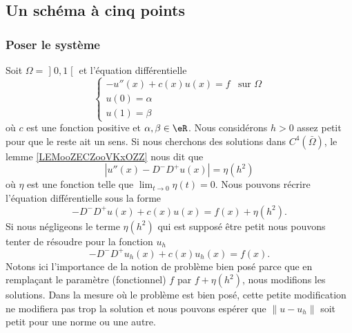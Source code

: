 \subsection{Un schéma à cinq points}

\subsubsection{Poser le système}

Soit \( \Omega=\mathopen] 0 , 1 \mathclose[\) et l'équation différentielle
\begin{equation}        \label{EQooXJBWooRhCsLy}
     \begin{cases}
         -u''(x)+c(x)u(x)=f    &   \text{sur } \Omega\\
         u(0)=\alpha\\
         u(1)=\beta
     \end{cases}
\end{equation}
où \( c\) est une fonction positive et \( \alpha,\beta\in \eR\). Nous considérons \( h>0\) assez petit pour que le reste ait un sens. Si nous cherchons des solutions dans \( C^4(\bar\Omega)\), le lemme \ref{LEMooZECZooVKxOZZ} nous dit que 
\begin{equation}
    | u''(x)-D^-D^+u(x) |=\eta(h^2)
\end{equation}
où \( \eta\) est une fonction telle que \( \lim_{t\to 0} \eta(t)=0\). Nous pouvons récrire l'équation différentielle sous la forme
\begin{equation}
    -D^-D^+u(x)+c(x)u(x)=f(x)+\eta(h^2).
\end{equation}
Si nous négligeons le terme \( \eta(h^2)\) qui est supposé être petit nous pouvons tenter de résoudre pour la fonction \( u_h\)
\begin{equation}
    -D^-D^+u_h(x)+c(x)u_h(x)=f(x).
\end{equation}
Notons ici l'importance de la notion de problème bien posé parce que en remplaçant le paramètre (fonctionnel) \( f\) par \( f+\eta(h^2)\), nous modifions les solutions. Dans la mesure où le problème est bien posé, cette petite modification ne modifiera pas trop la solution et nous pouvons espérer que \( \| u-u_h \|\) soit petit pour une norme ou une autre.

